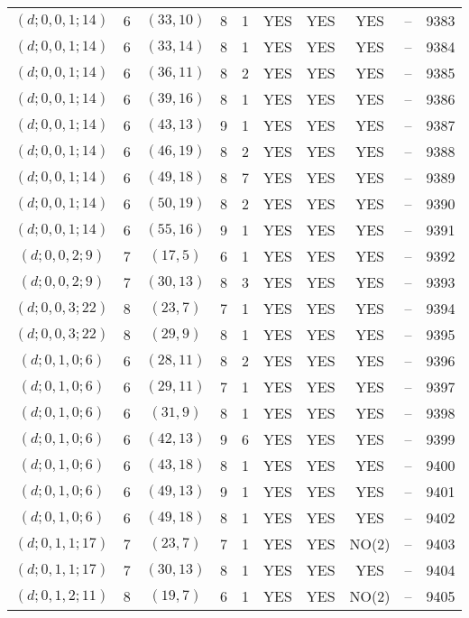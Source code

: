 \begin{longtable}{|c|c|c|c|c|c|c|c|c|c|}
$(d; 0, 0, 1; 14)$ & 6 & $(33, 10)$ & 8 & 1 & YES & YES & YES & -- & 9383\\
$(d; 0, 0, 1; 14)$ & 6 & $(33, 14)$ & 8 & 1 & YES & YES & YES & -- & 9384\\
$(d; 0, 0, 1; 14)$ & 6 & $(36, 11)$ & 8 & 2 & YES & YES & YES & -- & 9385\\
$(d; 0, 0, 1; 14)$ & 6 & $(39, 16)$ & 8 & 1 & YES & YES & YES & -- & 9386\\
$(d; 0, 0, 1; 14)$ & 6 & $(43, 13)$ & 9 & 1 & YES & YES & YES & -- & 9387\\
$(d; 0, 0, 1; 14)$ & 6 & $(46, 19)$ & 8 & 2 & YES & YES & YES & -- & 9388\\
$(d; 0, 0, 1; 14)$ & 6 & $(49, 18)$ & 8 & 7 & YES & YES & YES & -- & 9389\\
$(d; 0, 0, 1; 14)$ & 6 & $(50, 19)$ & 8 & 2 & YES & YES & YES & -- & 9390\\
$(d; 0, 0, 1; 14)$ & 6 & $(55, 16)$ & 9 & 1 & YES & YES & YES & -- & 9391\\
$(d; 0, 0, 2; 9)$ & 7 & $(17, 5)$ & 6 & 1 & YES & YES & YES & -- & 9392\\
$(d; 0, 0, 2; 9)$ & 7 & $(30, 13)$ & 8 & 3 & YES & YES & YES & -- & 9393\\
$(d; 0, 0, 3; 22)$ & 8 & $(23, 7)$ & 7 & 1 & YES & YES & YES & -- & 9394\\
$(d; 0, 0, 3; 22)$ & 8 & $(29, 9)$ & 8 & 1 & YES & YES & YES & -- & 9395\\
$(d; 0, 1, 0; 6)$ & 6 & $(28, 11)$ & 8 & 2 & YES & YES & YES & -- & 9396\\
$(d; 0, 1, 0; 6)$ & 6 & $(29, 11)$ & 7 & 1 & YES & YES & YES & -- & 9397\\
$(d; 0, 1, 0; 6)$ & 6 & $(31, 9)$ & 8 & 1 & YES & YES & YES & -- & 9398\\
$(d; 0, 1, 0; 6)$ & 6 & $(42, 13)$ & 9 & 6 & YES & YES & YES & -- & 9399\\
$(d; 0, 1, 0; 6)$ & 6 & $(43, 18)$ & 8 & 1 & YES & YES & YES & -- & 9400\\
$(d; 0, 1, 0; 6)$ & 6 & $(49, 13)$ & 9 & 1 & YES & YES & YES & -- & 9401\\
$(d; 0, 1, 0; 6)$ & 6 & $(49, 18)$ & 8 & 1 & YES & YES & YES & -- & 9402\\
$(d; 0, 1, 1; 17)$ & 7 & $(23, 7)$ & 7 & 1 & YES & YES & NO(2) & -- & 9403\\
$(d; 0, 1, 1; 17)$ & 7 & $(30, 13)$ & 8 & 1 & YES & YES & YES & -- & 9404\\
$(d; 0, 1, 2; 11)$ & 8 & $(19, 7)$ & 6 & 1 & YES & YES & NO(2) & -- & 9405\\

\end{longtable}

